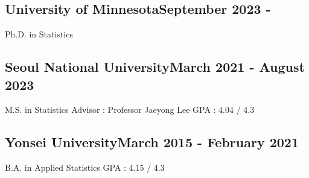 \vspace*{10pt}
\subsection {{University of Minnesota}\hfill September 2023 -}
Ph.D. in Statistics \\
\vspace*{2pt}

\subsection {{Seoul National University}\hfill March 2021 - August 2023}
M.S. in Statistics  \quad Advisor : Professor Jaeyong Lee \quad \quad GPA : 4.04 / 4.3

\vspace*{6pt}
\subsection{{Yonsei University}\hfill March 2015 - February 2021}
B.A. in Applied Statistics \quad GPA : 4.15 / 4.3